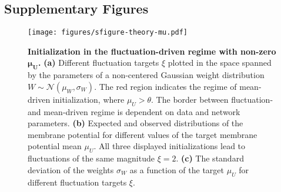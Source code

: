 \documentclass[11pt,a4paper]{article}
\begin{document}
\begin{refsection}

\renewcommand{\thefigure}{S\arabic{figure}}
\setcounter{figure}{0}    

\renewcommand{\thetable}{S\arabic{table}}
\setcounter{table}{0}    

\renewcommand{\thesubsection}{S\arabic{subsection}}  



\clearpage
\section*{Supplementary Figures}

\begin{figure}[htb]
	\texttt{[image: figures/sfigure-theory-mu.pdf]}
\caption{\textbf{Initialization in the fluctuation-driven regime with non-zero $\mathbf{\mu_U}$.}
	\textbf{(a)} Different fluctuation targets $\xi$ plotted in the space spanned by the parameters of a non-centered Gaussian weight distribution $W \sim \mathcal{N}(\mu_W, \sigma_W)$. The red region indicates the regime of mean-driven initialization, where $\mu_U > \theta$. The border between fluctuation- and mean-driven regime is dependent on data and network parameters.
	\textbf{(b)} Expected and observed distributions of the membrane potential for different values of the target membrane potential mean $\mu_U$. All three displayed initializations lead to fluctuations of the same magnitude $\xi=2$.
	\textbf{(c)} The standard deviation of the weights $\sigma_W$ as a function of the target $\mu_U$ for different fluctuation targets $\xi$.
}
\label{sfig:theory-mu}
\end{figure}




\end{refsection}
\end{document}
